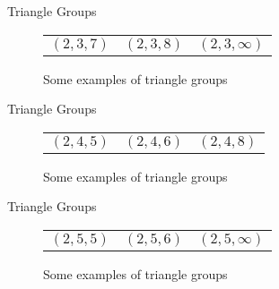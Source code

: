 \documentclass[
	american,
	sections numbered,
	usenames,
	xcolor=dvipsnames,
	aspectratio=169,
]{beamer}
\theoremstyle{plain}%
\begin{document}
\begin{frame}{Triangle Groups}

	\begin{figure}
        \centering
        \begin{tabular}{ccc}
        
        $(2,3,7)$ & $(2,3,8)$ & $(2,3,\infty)$ \\[6pt]
        
        \end{tabular}
        \caption{Some examples of triangle groups}
        \label{fig:tri}
    \end{figure}

\end{frame}

\begin{frame}{Triangle Groups}

	\begin{figure}
        \centering
        \begin{tabular}{ccc}
        
        $(2,4,5)$ & $(2,4,6)$ & $(2,4,8)$ \\[6pt]
        
        \end{tabular}
        \caption{Some examples of triangle groups}
        \label{fig:tri}
    \end{figure}

\end{frame}

\begin{frame}{Triangle Groups}

	\begin{figure}
        \centering
        \begin{tabular}{ccc}
        
        $(2,5,5)$ & $(2,5,6)$ & $(2,5,\infty)$ \\[6pt]
        
        \end{tabular}
        \caption{Some examples of triangle groups}
        \label{fig:tri}
    \end{figure}

\end{frame}
\end{document}
